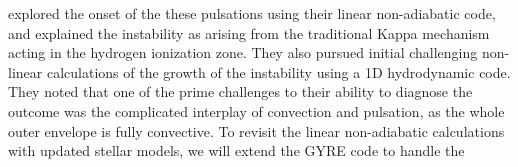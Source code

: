 \citet{1997AampA...327..224H} explored the onset of the these pulsations using
their linear non-adiabatic code, and explained the instability 
as arising from the traditional Kappa mechanism acting in the
hydrogen ionization zone. They also pursued initial challenging
non-linear calculations of the growth of the instability using a 1D 
hydrodynamic code. They noted that one of the prime challenges to
their ability to diagnose the outcome was the complicated interplay of
convection and pulsation, as the whole outer envelope is fully
convective. To revisit the linear non-adiabatic calculations with updated stellar models, we will extend the GYRE code to handle the


